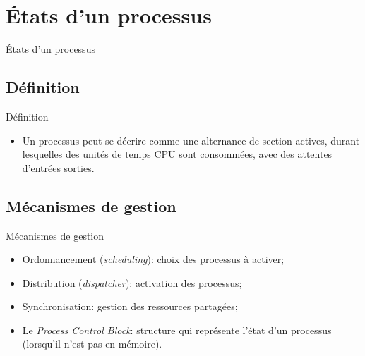 \def\sectitle{États d'un processus}
\section{\sectitle}

\begin{frame}{\sectitle}

\def\subsectitle{Définition}
\subsection{\subsectitle}

\begin{exampleblock}{\subsectitle}
\begin{itemize}
    \item Un processus peut se décrire comme une alternance de section actives,
    durant lesquelles des unités de temps CPU sont consommées, avec des attentes
    d'entrées sorties.
\end{itemize}
\end{exampleblock}

\def\subsectitle{Mécanismes de gestion}
\subsection{\subsectitle}

\begin{block}{\subsectitle}
\begin{itemize}
    \item Ordonnancement (\textit{scheduling}): choix des processus à activer;
    \item Distribution (\textit{dispatcher}): activation des processus;
    \item Synchronisation: gestion des ressources partagées;
    \item Le \textit{Process Control Block}: structure qui représente l'état
    d'un processus (lorsqu'il n'est pas en mémoire).
\end{itemize}
\end{block}

\end{frame}




\def\sectitle{Vision des états de processus court terme}

